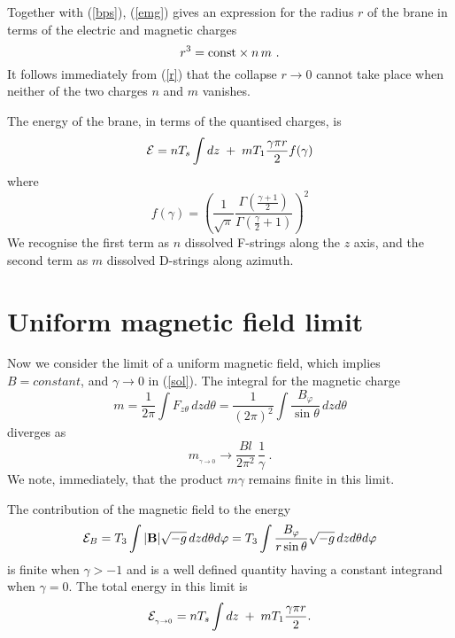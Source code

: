 \documentclass[a4paper,12pt]{article}
\begin{document}
Together with (\ref{bps}), (\ref{emg}) gives an expression for the radius $r$ of the brane in terms of the electric and magnetic charges
\begin{equation}
r^3={\rm const}\times n\,m\ .
\label{r}
\end{equation}
It follows immediately from (\ref{r}) that the collapse $r\to 0$ cannot take place when neither of the two charges $n$ and $m$ vanishes.

The energy of the brane, in terms of the quantised charges, is
\begin{equation}
{\cal E}=nT_s\int dz\; +\; mT_1\frac{\gamma\pi r}{2}f(\gamma )
\label{en}
\end{equation}
where
\begin{equation}
f(\gamma )=\left(\frac{1}{\sqrt{\pi}}\frac{\Gamma (\frac{\gamma +1}{2})}
{\Gamma (\frac{\gamma}{2}+1)}\right)^2
\label{fac}
\end{equation}
We recognise the first term as $n$ dissolved F-strings along the $z$ axis, and the second term as $m$ dissolved D-strings along azimuth.

\section{Uniform magnetic field limit}

Now we consider the limit of a uniform magnetic field, which implies $B=constant$, and $\gamma\to 0$ in (\ref{sol}). The integral for the magnetic charge 
\begin{equation}
 m=\frac{1}{2\pi}\int F_{z\theta}\,dzd\theta =\frac{1}{(2\pi )^2}
\int\frac{B_{\varphi}}{\sin\theta}\,dzd\theta
\label{u3}
\end{equation}
diverges as
\begin{equation}
m_{{}_{\gamma\to 0}}\to\frac{Bl}{2\pi^2}\,\frac{1}{\gamma}\ .
\label{u4}
\end{equation}
We note, immediately, that the product $m\gamma$ remains finite in this limit.

The contribution of the magnetic field to the energy
\begin{equation}
{\cal E}_B=T_3\int |{\bf B} |\sqrt{-g}\,dzd\theta d\varphi =
T_3\int \frac{B_{\varphi}}{r\sin\theta}\sqrt{-g}\,dzd\theta d\varphi
\label{u1}
\end{equation}
is finite when $\gamma >-1$ and is a well defined quantity having a constant integrand when $\gamma =0$. The total energy in this limit is
\begin{equation}
{\cal E}_{{}_{\gamma\to 0}}=nT_s\int dz\; +\; mT_1\frac{\gamma\pi r}{2}.
\label{u2}
\end{equation}
\end{document}
